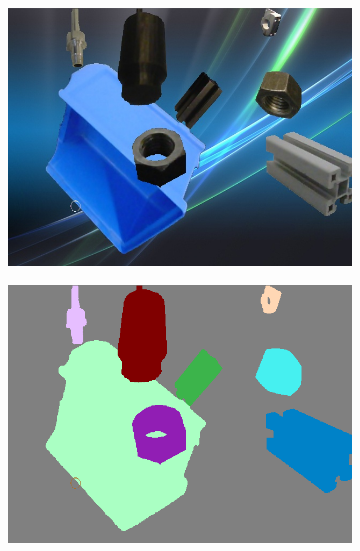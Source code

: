 \begin{figure}[h]
\begin{subfigure}{.24\textwidth}
			\includegraphics[width=1\linewidth]{images/sample_predictions/00132}
		\end{subfigure}
		\begin{subfigure}{.24\textwidth}
			\centering
			\includegraphics[width=1\linewidth]{images/sample_predictions/00132_full_gt}
		\end{subfigure}
		\begin{subfigure}{.24\textwidth}
			\centering

\end{subfigure}
\end{figure}
